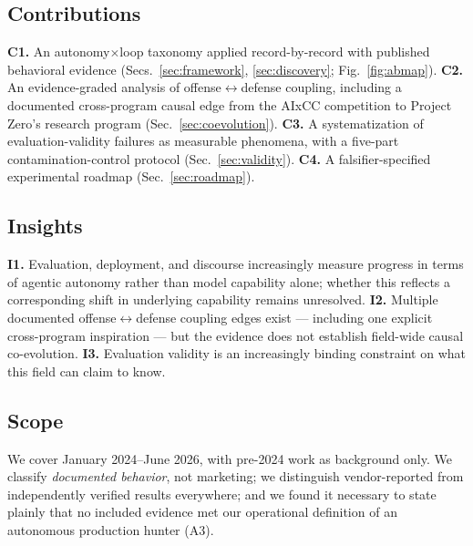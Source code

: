 \subsection{Contributions}
\textbf{C1.} An autonomy$\times$loop taxonomy applied record-by-record with published
behavioral evidence (Secs.~\ref{sec:framework}, \ref{sec:discovery}; Fig.~\ref{fig:abmap}).
\textbf{C2.} An evidence-graded analysis of offense$\leftrightarrow$defense coupling, including
a documented cross-program causal edge from the AIxCC competition to Project Zero's research
program (Sec.~\ref{sec:coevolution}). \textbf{C3.} A systematization of evaluation-validity
failures as measurable phenomena, with a five-part contamination-control protocol
(Sec.~\ref{sec:validity}). \textbf{C4.} A falsifier-specified experimental roadmap
(Sec.~\ref{sec:roadmap}).

\subsection{Insights}
\textbf{I1.} Evaluation, deployment, and discourse increasingly measure progress in terms of
agentic autonomy rather than model capability alone; whether this reflects a corresponding
shift in underlying capability remains unresolved. \textbf{I2.} Multiple documented
offense$\leftrightarrow$defense coupling edges exist --- including one explicit cross-program
inspiration --- but the evidence does not establish field-wide causal co-evolution.
\textbf{I3.} Evaluation validity is an increasingly binding constraint on what this field can
claim to know.

\subsection{Scope}
We cover January 2024--June 2026, with pre-2024 work as background only. We classify
\emph{documented behavior}, not marketing; we distinguish vendor-reported from independently
verified results everywhere; and we found it necessary to state plainly that no included
evidence met our operational definition of an autonomous production hunter (A3).
